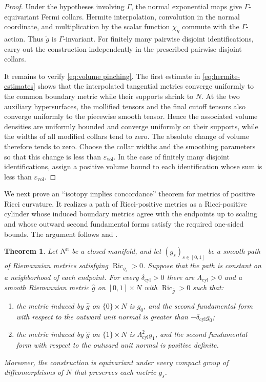 \documentclass[11pt,reqno]{amsart}
\newtheorem{theorem}{Theorem}[section]
\theoremstyle{definition}
\numberwithin{equation}{section}
\DeclareMathOperator{\Ric}{Ric}
\begin{document}
\begin{proof}
Under the hypotheses involving $\Gamma$, the normal exponential maps
give $\Gamma$-equivariant Fermi collars.  Hermite interpolation,
convolution in the normal coordinate, and multiplication by the scalar
function $\chi_\eta$ commute with the $\Gamma$-action.  Thus
$\widetilde g$ is $\Gamma$-invariant.  For finitely many pairwise
disjoint identifications, carry out the construction independently in
the prescribed pairwise disjoint collars.

It remains to verify \eqref{eq:volume pinching}. The first estimate in
\eqref{eq:hermite-estimates} shows that the interpolated tangential
metrics converge uniformly to the common boundary metric while their
supports shrink to \(N\).  At the two auxiliary hypersurfaces, the
mollified tensors and the final cutoff tensors also converge uniformly
to the piecewise smooth tensor.  Hence the associated volume densities
are uniformly bounded and converge uniformly on their supports, while
the widths of all modified collars tend to zero.  The absolute change
of volume therefore tends to zero.  Choose the collar widths and the
smoothing parameters so that this change is less than
\(\varepsilon_{\mathrm{vol}}\).  In the case of finitely many disjoint
identifications, assign a positive volume bound to each identification
whose sum is less than \(\varepsilon_{\mathrm{vol}}\).
\end{proof}

We next prove an ``isotopy implies concordance'' theorem for metrics of
positive Ricci curvature.  It realizes a path of Ricci-positive metrics
as a Ricci-positive cylinder whose induced boundary metrics agree with
the endpoints up to scaling and whose outward second fundamental forms
satisfy the required one-sided bounds.  The argument follows
\cite[Theorem~A.1]{Burdick} and \cite[Assertion]{Perelman1997}.

\begin{theorem}
\label{thm:path-cylinder-unified}
Let $N^n$ be a closed manifold, and let $(g_s)_{s\in[0,1]}$ be a smooth
path of Riemannian metrics satisfying $\Ric_{g_s}>0$.  Suppose that the
path is constant on a neighborhood of each endpoint.  For every
$\delta_{\mathrm{cyl}}>0$ there are $\Lambda_{\mathrm{cyl}}>0$ and a
smooth Riemannian metric $\widehat g$ on
$[0,1]\times N$ with $\Ric_{\widehat g}>0$ such that:
\begin{enumerate}[label=\textup{(\roman*)}]
\item the metric induced by $\widehat g$ on $\{0\}\times N$ is $g_0$,
and the second fundamental form with respect to the outward unit normal
is greater than $-\delta_{\mathrm{cyl}}g_0$;
\item the metric induced by $\widehat g$ on $\{1\}\times N$ is
$\Lambda_{\mathrm{cyl}}^2g_1$, and the second fundamental form with respect to the outward
unit normal is positive definite.
\end{enumerate}
Moreover, the construction is equivariant under every compact group of
diffeomorphisms of $N$ that preserves each metric $g_s$.
\end{theorem}
\end{document}
